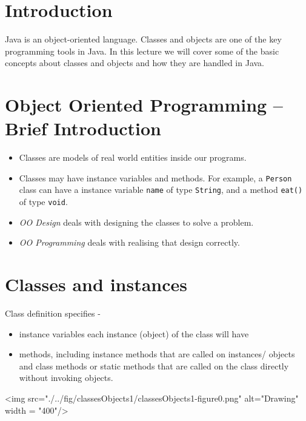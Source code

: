 \def\topic{Classes and Objects - 1}

\section{Introduction}

Java is an object-oriented language. Classes and objects are one of the key programming tools in Java. In this lecture we will cover some of the basic concepts about classes and objects and how they are handled in Java.

\section{Object Oriented Programming -- Brief Introduction}

  \begin{itemize}
  \item Classes are models of real world entities inside our programs.
\item Classes may have instance variables and methods. For example, a \texttt{Person} class can have a instance variable \texttt{name} of type \texttt{String}, and a method \texttt{eat()} of type \texttt{void}.
\item \emph{OO Design} deals with designing the classes to solve a problem.
\item \emph{OO Programming} deals with realising that design correctly.
  \end{itemize}

\section{Classes and instances}

  Class definition specifies -   
  \begin{itemize}
  \item instance variables each instance (object) of the class will have
  \item methods, including instance methods that are called on instances/ objects and class methods or static methods that are called on the class directly without invoking objects.
  \end{itemize}
  
\vskip 0.1cm
  	\begin{center}
		<img src="./../fig/classesObjects1/classesObjects1-figure0.png" alt="Drawing" width = "400"/> 
	\end{center}
\vskip 0.1cm

